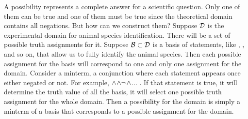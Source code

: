 \documentclass[11pt,letterpaper,fleqn]{memoir} %
\begin{document}
A possibility represents a complete answer for a scientific question. Only one of them can be true and one of them must be true since the theoretical domain contains all negations. But how can we construct them? Suppose $\mathcal{D}$ is the experimental domain for animal species identification. There will be a set of possible truth assignments for it. Suppose $\mathcal{B} \subset \mathcal{D}$ is a basis of statements, like , ,  and so on, that allow us to fully identify the animal species. Then each possible assignment for the basis will correspond to one and only one assignment for the domain. Consider a minterm, a conjunction where each statement appears once either negated or not. For example, $\wedge$$\wedge\neg$$\wedge$... . If that statement is true, it will determine the truth value of all the basis, it will select one possible truth assignment for the whole domain. Then a possibility for the domain is simply a minterm of a basis that corresponds to a possible assignment for the domain.
\end{document}
